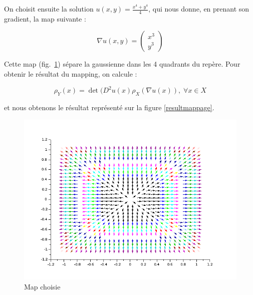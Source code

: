 \documentclass[12pt,a4paper,twoside]{article}
\begin{document}
On choisit ensuite la solution $\displaystyle u(x,y) = \frac{x^4 + y^4}{4}$, qui nous donne, en prenant son gradient, la map suivante :

\begin{equation}
\displaystyle \nabla u (x,y) = \begin{pmatrix}x^3\\y^3 \end{pmatrix} 
\end{equation}

Cette map (fig.~\ref{mapchoisie}) sépare la gaussienne dans les 4 quadrants du repère. Pour obtenir le résultat du
mapping, on calcule :


$$ \rho_Y(x) =  \det(D^2 u(x) \rho_X(\nabla u(x)), \; \forall x \in X $$



et nous obtenons le résultat
représenté sur la figure \ref{resultmappage}.

\begin{figure}
\begin{center}
\includegraphics[scale=0.5]{Images/mapchoisie.png}
\caption{Map choisie}
\label{mapchoisie}
\end{center}
\end{figure}
\end{document}
